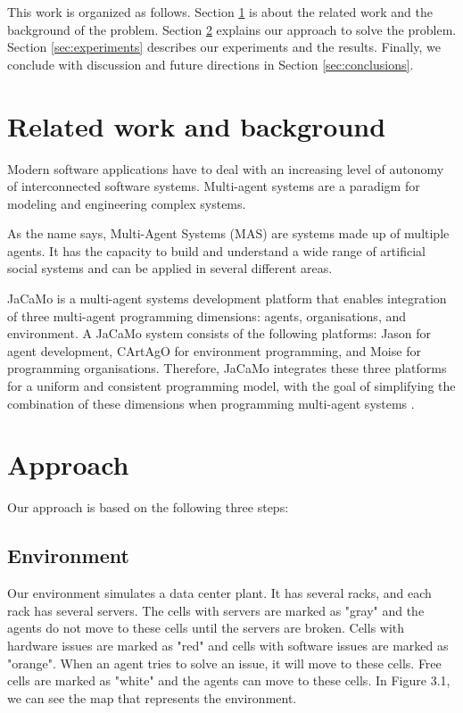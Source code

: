 \documentclass[letterpaper]{article}
\begin{document}
This work is organized as follows. Section \ref{sec:relatedwork} is about the related work and the background of the problem. Section \ref{sec:approach} explains our approach to solve the problem. Section \ref{sec:experiments} describes our experiments and the results. Finally, we conclude with discussion and future directions in Section \ref{sec:conclusions}.

\section{Related work and background}\label{sec:relatedwork}

Modern software applications have to deal with an increasing level of autonomy of interconnected software systems. Multi-agent systems are a paradigm for modeling and engineering complex systems. \cite{boissier2020multi}

As the name says, Multi-Agent Systems (MAS) are systems made up of multiple agents. It has the capacity to build and understand a wide range of artificial social systems and can be applied in several different areas.\cite{wooldridge2009introduction}

JaCaMo \cite{boissier2013multi} is a multi-agent systems development platform that enables integration of three multi-agent programming dimensions: agents, organisations, and environment. A JaCaMo system consists of the following platforms: Jason \cite{bordini2007programming} for agent development, CArtAgO \cite{bordini2009multi} for environment programming, and Moise \cite{hubner2007developing} for programming organisations. Therefore, JaCaMo integrates these three platforms for a uniform and consistent programming model, with the goal of simplifying the combination of these dimensions when programming multi-agent systems \cite{boissier2013multi}.

\section{Approach}\label{sec:approach}

Our approach is based on the following three steps:

\subsection{Environment}

Our environment simulates a data center plant. It has several racks, and each rack has several servers. The cells with servers are marked as "gray" and the agents do not move to these cells until the servers are broken. Cells with hardware issues are marked as "red" and cells with software issues are marked as "orange". When an agent tries to solve an issue, it will move to these cells. Free cells are marked as "white" and the agents can move to these cells. In Figure 3.1, we can see the map that represents the environment.
\end{document}
